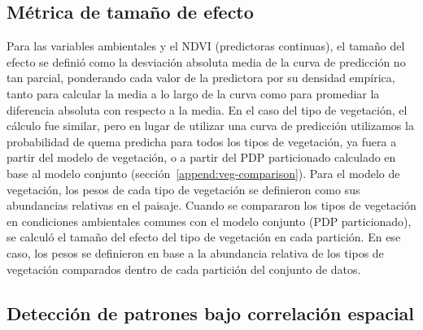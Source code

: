 \begin{figure}[p]
\end{figure}

\FloatBarrier

\subsection{Métrica de tamaño de efecto}\label{append:effsize}

Para las variables ambientales y el NDVI (predictoras continuas), el tamaño del efecto se definió como la desviación absoluta media de la curva de predicción no tan parcial, ponderando cada valor de la predictora por su densidad empírica, tanto para calcular la media a lo largo de la curva como para promediar la diferencia absoluta con respecto a la media. En el caso del tipo de vegetación, el cálculo fue similar, pero en lugar de utilizar una curva de predicción utilizamos la probabilidad de quema predicha para todos los tipos de vegetación, ya fuera a partir del modelo de vegetación, o a partir del PDP particionado calculado en base al modelo conjunto (sección~\ref{append:veg-comparison}). Para el modelo de vegetación, los pesos de cada tipo de vegetación se definieron como sus abundancias relativas en el paisaje. Cuando se compararon los tipos de vegetación en condiciones ambientales comunes con el modelo conjunto (PDP particionado), se calculó el tamaño del efecto del tipo de vegetación en cada partición. En ese caso, los pesos se definieron en base a la abundancia relativa de los tipos de vegetación comparados dentro de cada partición del conjunto de datos.

\subsection{Detección de patrones bajo correlación espacial}\label{append:pvalues}

